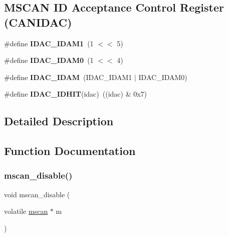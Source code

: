 \subsection*{M\+S\+C\+AN ID Acceptance Control Register (C\+A\+N\+I\+D\+AC)}
\begin{DoxyCompactItemize}
\item 
\mbox{\label{group__RTEMSBSPsPowerPCGen5200MSCAN_gabb87321ce16cea732e5fce2dfb57febc}} 
\#define {\bfseries I\+D\+A\+C\+\_\+\+I\+D\+A\+M1}~(1 $<$$<$ 5)
\item 
\mbox{\label{group__RTEMSBSPsPowerPCGen5200MSCAN_ga61ecb97625d57aff1709d711f28bbbe1}} 
\#define {\bfseries I\+D\+A\+C\+\_\+\+I\+D\+A\+M0}~(1 $<$$<$ 4)
\item 
\mbox{\label{group__RTEMSBSPsPowerPCGen5200MSCAN_gafc9901f4b9cda5d42ab15eadc96183be}} 
\#define {\bfseries I\+D\+A\+C\+\_\+\+I\+D\+AM}~(I\+D\+A\+C\+\_\+\+I\+D\+A\+M1 $\vert$ I\+D\+A\+C\+\_\+\+I\+D\+A\+M0)
\item 
\mbox{\label{group__RTEMSBSPsPowerPCGen5200MSCAN_ga34e3a73a9965c60065982656ba1ffa85}} 
\#define {\bfseries I\+D\+A\+C\+\_\+\+I\+D\+H\+IT}(idac)~((idac) \& 0x7)
\end{DoxyCompactItemize}


\subsection{Detailed Description}


\subsection{Function Documentation}
\mbox{\label{group__RTEMSBSPsPowerPCGen5200MSCAN_gad8c8f94ea2a29e3052664a870319cbec}} 
\subsubsection{\texorpdfstring{mscan\_disable()}{mscan\_disable()}}
{\footnotesize\ttfamily void mscan\+\_\+disable (\begin{DoxyParamCaption}\item[{volatile \mbox{\hyperlink{group__RTEMSBSPsPowerPCGen5200MSCAN_gacfd56a4a482c5e7da2cff003284b2d51}{mscan}} $\ast$}]{m }\end{DoxyParamCaption})}



